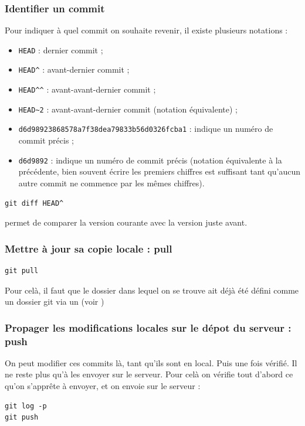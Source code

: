 \documentclass[a4paper,twoside]{article}
\begin{document}
\subsubsection{Identifier un commit}
Pour indiquer à quel commit on souhaite revenir, il existe plusieurs notations :
\begin{itemize}
\item \verb|HEAD| : dernier commit ;
\item \verb|HEAD^| : avant-dernier commit ;
\item \verb|HEAD^^| : avant-avant-dernier commit ;
\item \verb|HEAD~2| : avant-avant-dernier commit (notation équivalente) ;
\item \verb|d6d98923868578a7f38dea79833b56d0326fcba1| : indique un numéro de commit précis ;
\item \verb|d6d9892| : indique un numéro de commit précis (notation équivalente à la précédente, bien souvent écrire les premiers chiffres est suffisant tant qu'aucun autre commit ne commence par les mêmes chiffres).
\end{itemize}

\begin{exemple}
\begin{verbatim}
git diff HEAD^
\end{verbatim}
permet de comparer la version courante avec la version juste avant.
\end{exemple}

\subsubsection{Mettre à jour sa copie locale : pull} 
\begin{verbatim}
git pull
\end{verbatim}

Pour celà, il faut que le dossier dans lequel on se trouve ait déjà été défini comme un dossier git via un  (voir )

\subsubsection{Propager les modifications locales sur le dépot du serveur : push}
On peut modifier ces commits là, tant qu'ils sont en local. Puis une fois vérifié. Il ne reste plus qu'à les envoyer sur le serveur. Pour celà on vérifie tout d'abord ce qu'on s'apprête à envoyer, et on envoie sur le serveur : 
\begin{verbatim}
git log -p
git push
\end{verbatim}
\end{document}
